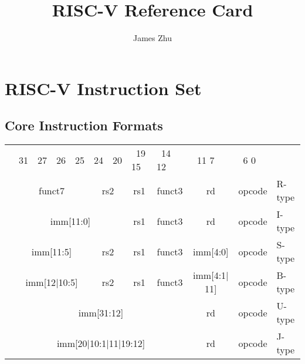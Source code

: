 \documentclass{article}
\newcommand{\instbit}[1]{\mbox{\scriptsize #1}}
\newcommand{\instbitrange}[2]{~\instbit{#1} \hfill \instbit{#2}~}
\begin{document}
\pretitle{\vspace{-0.75in}\begin{center}\LARGE \textbf }
\title{RISC-V Reference Card}
\posttitle{\par\end{center}}
\author{James Zhu}
\predate{}
\date{}
\postdate{}
\maketitle

\section*{RISC-V Instruction Set}

\subsection*{Core Instruction Formats}
\begin{center}
\begin{tabular}
{p{0in}p{0.4in}p{0.05in}p{0.05in}p{0.05in}p{0.05in}p{0.4in}p{0.6in}p{0.4in}p{0.6in}p{0.7in}l}
&
\multicolumn{1}{l}{\instbit{31}} &
\multicolumn{1}{r}{\instbit{27}} &
\instbit{26} &
\instbit{25} &
\multicolumn{1}{l}{\instbit{24}} &
\multicolumn{1}{r}{\instbit{20}} &
\instbitrange{19}{15} &
\instbitrange{14}{12} &
\instbitrange{11}{7} &
\instbitrange{6}{0} \\
\cline{2-11}

&
\multicolumn{4}{|c|}{funct7} &
\multicolumn{2}{c|}{rs2} &
\multicolumn{1}{c|}{rs1} &
\multicolumn{1}{c|}{funct3} &
\multicolumn{1}{c|}{rd} &
\multicolumn{1}{c|}{opcode} & R-type \\
\cline{2-11}

&
\multicolumn{6}{|c|}{imm[11:0]} &
\multicolumn{1}{c|}{rs1} &
\multicolumn{1}{c|}{funct3} &
\multicolumn{1}{c|}{rd} &
\multicolumn{1}{c|}{opcode} & I-type \\
\cline{2-11}

&
\multicolumn{4}{|c|}{imm[11:5]} &
\multicolumn{2}{c|}{rs2} &
\multicolumn{1}{c|}{rs1} &
\multicolumn{1}{c|}{funct3} &
\multicolumn{1}{c|}{imm[4:0]} &
\multicolumn{1}{c|}{opcode} & S-type \\
\cline{2-11}

&
\multicolumn{4}{|c|}{imm[12$\vert$10:5]} &
\multicolumn{2}{c|}{rs2} &
\multicolumn{1}{c|}{rs1} &
\multicolumn{1}{c|}{funct3} &
\multicolumn{1}{c|}{imm[4:1$\vert$11]} &
\multicolumn{1}{c|}{opcode} & B-type \\
\cline{2-11}

&
\multicolumn{8}{|c|}{imm[31:12]} &
\multicolumn{1}{c|}{rd} &
\multicolumn{1}{c|}{opcode} & U-type \\
\cline{2-11}

&
\multicolumn{8}{|c|}{imm[20$\vert$10:1$\vert$11$\vert$19:12]} &
\multicolumn{1}{c|}{rd} &
\multicolumn{1}{c|}{opcode} & J-type \\
\cline{2-11}
\end{tabular}
\end{center}
\end{document}
